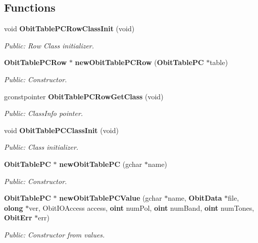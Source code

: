 \subsection*{Functions}
\begin{CompactItemize}
\item 
void {\bf Obit\-Table\-PCRow\-Class\-Init} (void)
\begin{CompactList}\small\item\em Public: Row Class initializer. \item\end{CompactList}\item 
{\bf Obit\-Table\-PCRow} $\ast$ {\bf new\-Obit\-Table\-PCRow} ({\bf Obit\-Table\-PC} $\ast$table)
\begin{CompactList}\small\item\em Public: Constructor. \item\end{CompactList}\item 
gconstpointer {\bf Obit\-Table\-PCRow\-Get\-Class} (void)
\begin{CompactList}\small\item\em Public: Class\-Info pointer. \item\end{CompactList}\item 
void {\bf Obit\-Table\-PCClass\-Init} (void)
\begin{CompactList}\small\item\em Public: Class initializer. \item\end{CompactList}\item 
{\bf Obit\-Table\-PC} $\ast$ {\bf new\-Obit\-Table\-PC} (gchar $\ast$name)
\begin{CompactList}\small\item\em Public: Constructor. \item\end{CompactList}\item 
{\bf Obit\-Table\-PC} $\ast$ {\bf new\-Obit\-Table\-PCValue} (gchar $\ast$name, {\bf Obit\-Data} $\ast$file, {\bf olong} $\ast$ver, Obit\-IOAccess access, {\bf oint} num\-Pol, {\bf oint} num\-Band, {\bf oint} num\-Tones, {\bf Obit\-Err} $\ast$err)
\begin{CompactList}\small\item\em Public: Constructor from values. \item\end{CompactList}\item 

\end{CompactItemize}
